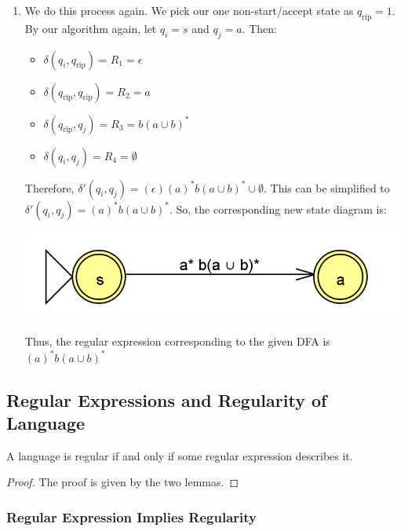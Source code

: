 \documentclass[letterpaper]{article}
\begin{document}
\begin{enumerate}
    \item We do this process again. We pick our one non-start/accept state as $q_{\text{rip}} = 1$. By our algorithm again, let $q_i = s$ and $q_j = a$. Then: 
    \begin{itemize}
        \item $\delta(q_i, q_{\text{rip}}) = R_1 = \epsilon$
        \item $\delta(q_{\text{rip}}, q_{\text{rip}}) = R_2 = a$
        \item $\delta(q_{\text{rip}}, q_j) = R_3 = b(a \cup b)^*$
        \item $\delta(q_i, q_j) = R_4 = \emptyset$
    \end{itemize}
    Therefore, $\delta'(q_i, q_j) = (\epsilon)(a)^* b(a \cup b)^* \cup \emptyset$. This can be simplified to $\delta'(q_i, q_j) = (a)^* b(a \cup b)^*$. So, the corresponding new state diagram is:
    \begin{center}
        \includegraphics[scale=0.4]{../assets/dfa_regex_4.png}
    \end{center}
    Thus, the regular expression corresponding to the given DFA is $\boxed{(a)^* b(a \cup b)^*}$
\end{enumerate}



\subsection{Regular Expressions and Regularity of Language}
\begin{theorem}{}{}
    A language is regular if and only if some regular expression describes it. 
\end{theorem}

\begin{mdframed}[]
    \begin{proof}
        The proof is given by the two lemmas. 
    \end{proof}    
\end{mdframed}

\subsubsection{Regular Expression Implies Regularity}
\end{document}
